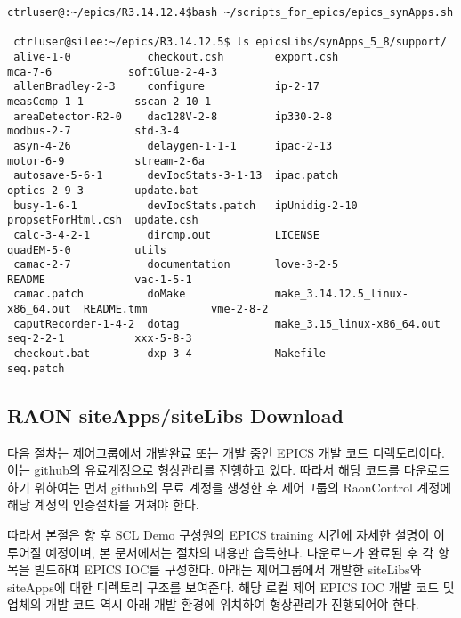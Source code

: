 \documentclass[11pt
  , a4paper
  , article
  , oneside
]{memoir}
\begin{document}
 \begin{lstlisting}[style=termstyle]
 ctrluser@:~/epics/R3.14.12.4$bash ~/scripts_for_epics/epics_synApps.sh
 
 ctrluser@silee:~/epics/R3.14.12.5$ ls epicsLibs/synApps_5_8/support/
 alive-1-0            checkout.csh        export.csh                       mca-7-6            softGlue-2-4-3
 allenBradley-2-3     configure           ip-2-17                          measComp-1-1        sscan-2-10-1
 areaDetector-R2-0    dac128V-2-8         ip330-2-8                        modbus-2-7          std-3-4
 asyn-4-26            delaygen-1-1-1      ipac-2-13                        motor-6-9           stream-2-6a
 autosave-5-6-1       devIocStats-3-1-13  ipac.patch                       optics-2-9-3        update.bat
 busy-1-6-1           devIocStats.patch   ipUnidig-2-10                    propsetForHtml.csh  update.csh
 calc-3-4-2-1         dircmp.out          LICENSE                          quadEM-5-0          utils
 camac-2-7            documentation       love-3-2-5                       README              vac-1-5-1
 camac.patch          doMake              make_3.14.12.5_linux-x86_64.out  README.tmm          vme-2-8-2
 caputRecorder-1-4-2  dotag               make_3.15_linux-x86_64.out       seq-2-2-1           xxx-5-8-3
 checkout.bat         dxp-3-4             Makefile                         seq.patch
 \end{lstlisting}

\subsection{RAON siteApps/siteLibs Download}
다음 절차는 제어그룹에서 개발완료 또는 개발 중인 EPICS 개발 코드 디렉토리이다. 이는 github의 유료계정으로 형상관리를 진행하고 있다. 따라서 해당 코드를 다운로드하기 위하여는 먼저 github의 무료 계정을 생성한 후 제어그룹의 RaonControl 계정에 해당 계정의 인증절차를 거쳐야 한다.

따라서 본절은 향 후 SCL Demo 구성원의 EPICS training 시간에 자세한 설명이 이루어질 예정이며, 본 문서에서는 절차의 내용만 습득한다. 다운로드가 완료된 후 각 항목을 빌드하여 EPICS IOC를 구성한다. 아래는 제어그룹에서 개발한 siteLibs와 siteApps에 대한 디렉토리 구조를 보여준다. 해당 로컬 제어 EPICS IOC 개발 코드 및 업체의 개발 코드 역시 아래 개발 환경에 위치하여 형상관리가 진행되어야 한다.
\end{document}
